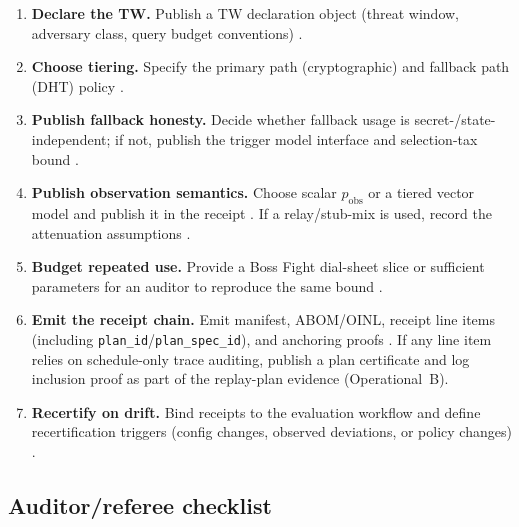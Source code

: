 \documentclass[11pt]{article}
\begin{document}
\begin{enumerate}[leftmargin=*]
\item \textbf{Declare the TW.} Publish a TW declaration object (threat window, adversary class, query budget conventions) \cite{series:threatwindows}.
\item \textbf{Choose tiering.} Specify the primary path (cryptographic) and fallback path (DHT) policy \cite{series:tieredpattern}.
\item \textbf{Publish fallback honesty.} Decide whether fallback usage is secret-/state-independent; if not, publish the trigger model interface and selection-tax bound \cite{series:selectiontax}.
\item \textbf{Publish observation semantics.} Choose scalar $p_{\mathrm{obs}}$ or a tiered vector model and publish it in the receipt \cite{series:tieredobsvec}.
If a relay/stub-mix is used, record the attenuation assumptions \cite{series:obsatten}.
\item \textbf{Budget repeated use.} Provide a Boss Fight dial-sheet slice or sufficient parameters for an auditor to reproduce the same bound \cite{series:bossfightdial}.
\item \textbf{Emit the receipt chain.} Emit manifest, ABOM/OINL, receipt line items (including \texttt{plan\_id}/\texttt{plan\_spec\_id}), and anchoring proofs \cite{series:receiptitems,series:releaseledger,series:transparency,series:planstateequiv}. If any line item relies on schedule-only trace auditing, publish a plan certificate and log inclusion proof as part of the replay-plan evidence (Operational~B).\cite{series:operationalB}
\item \textbf{Recertify on drift.} Bind receipts to the evaluation workflow and define recertification triggers (config changes, observed deviations, or policy changes) \cite{series:evalnotary,series:advantagecontracts}.
\end{enumerate}

\subsection{Auditor/referee checklist}
\end{document}

